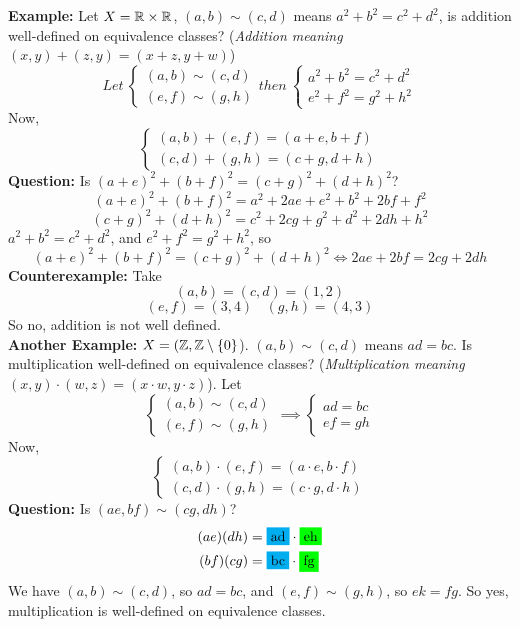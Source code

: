 \documentclass[openany]{report}
\begin{document}
\textbf{Example: } Let $X = \mathbb{R} \times \mathbb{R}$, $(a,b) \sim (c,d)$ means $a^2 + b^2 = c^2 + d^2$, is addition well-defined on equivalence classes? (\textit{Addition meaning $(x,y) + (z,y) = (x + z, y+w)$})\\
\[
Let \ 
\begin{cases}
(a,b) \sim (c,d)\\
(e,f) \sim (g,h)
\end{cases}
then \ 
\begin{cases}
    a^2 + b^2 = c^2 + d^2\\
    e^2 + f^2 = g^2 + h^2
\end{cases}
\]
Now,
\[
\begin{cases}
    (a,b) + (e,f) = (a + e, b+f)\\
    (c,d) + (g,h) = (c+g, d+h)
\end{cases}
\]
\textbf{Question:} Is $(a+e)^2 + (b+f)^2 = (c+g)^2 + (d+h)^2$?
$$(a+e)^2 + (b+f)^2 = a^2 + 2ae + e^2 + b^2 + 2bf + f^2$$
$$(c+g)^2 + (d+h)^2 = c^2 + 2cg + g^2 + d^2 + 2dh + h^2$$
$a^2 + b^2 = c^2 + d^2$, and $e^2 + f^2 = g^2 + h^2$, so 
$$(a+e)^2 + (b+f)^2 = (c+g)^2 + (d+h)^2 \iff 2ae + 2bf = 2cg + 2dh$$
\textbf{Counterexample:} Take 
$$(a,b) = (c,d) = (1,2)$$
$$(e,f) = (3,4) \ \ \ \ (g,h) = (4,3)$$
So no, addition is not well defined. \\[3ex]
\noindent
\textbf{Another Example:} $X = (\mathbb{Z}, \mathbb{Z} \setminus \{0\}$). $(a,b) \sim (c,d)$ means $ad = bc$. Is multiplication well-defined on equivalence classes? (\textit{Multiplication meaning $(x,y) \cdot (w,z) = (x \cdot w, y \cdot z)$}). Let
\[\begin{cases}
    (a,b) \sim (c,d)\\
    (e,f) \sim (g,h)
\end{cases} \implies \begin{cases}
    ad = bc\\
    ef = gh
\end{cases}\]
Now,
\[\begin{cases}
    (a,b) \cdot (e,f) = (a \cdot e, b \cdot f)\\
    (c,d) \cdot (g,h) = (c \cdot g, d \cdot h)
\end{cases}\]
\textbf{Question:} Is $(ae,bf)\sim(cg,dh)$?\\
\begin{align*}
    (ae)(dh) &= \hlblue{ad} \cdot \hlgreen{eh}\\
    (bf)(cg) &= \hlblue{bc} \cdot \hlgreen{fg}\\
\end{align*}
We have $(a,b) \sim (c,d)$, so $ad = bc$, and $(e,f) \sim (g,h)$, so $ek = fg$. So yes, multiplication is well-defined on equivalence classes.
\end{document}
